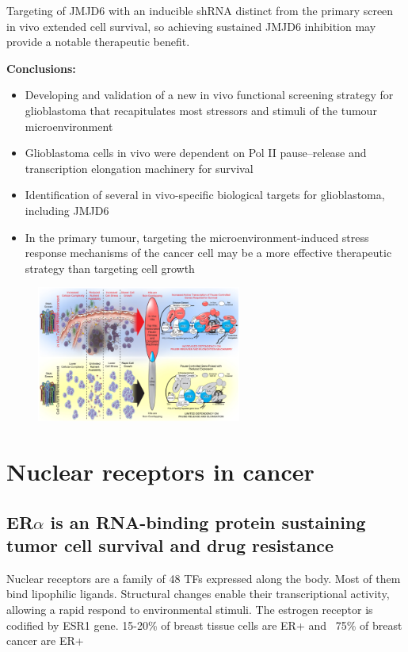 Targeting of JMJD6 with an inducible shRNA distinct from the primary screen in vivo extended cell survival, so achieving sustained JMJD6 inhibition may provide a notable therapeutic benefit.

\textbf{Conclusions:}
\begin{itemize}
\tightlist
\item Developing and validation of a new in vivo functional screening strategy for glioblastoma that recapitulates most stressors and ­stimuli of the tumour microenvironment
\item Glioblastoma cells in vivo were dependent on Pol II pause–release and transcription elongation machinery for survival
\item Identification of several in vivo-specific biological targets for glioblastoma, including JMJD6
\item In the primary tumour, targeting the microenvironment-induced stress response mechanisms of the cancer cell may be a more effective therapeutic strategy than targeting cell growth
\end{itemize}

\begin{figure}
\centering
\includegraphics[width=0.6\textwidth]{../_resources/RNAi.png}
\caption{}
\end{figure}

\section{Nuclear receptors in cancer}
\subsection{ER$\alpha$ is an RNA-binding protein sustaining tumor cell survival and drug resistance}
Nuclear receptors are a family of 48 TFs expressed along the body. Most of them bind lipophilic ligands.
Structural changes enable their transcriptional activity, allowing a rapid respond to environmental stimuli.
The estrogen receptor is codified by ESR1 gene. 15-20\% of breast tissue cells are ER+ and  ~75\% of breast cancer are ER+ 

